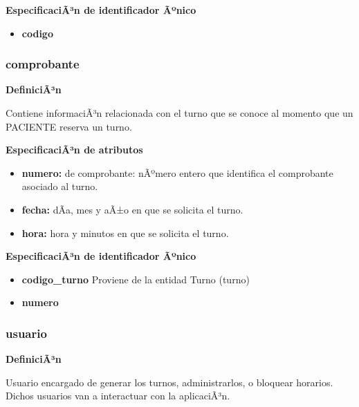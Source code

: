 \documentclass[a4paper,11pt]{article}
\begin{document}
\textbf{EspecificaciÃ³n de identificador Ãºnico}

\begin{itemize}

     \item \textbf{codigo}

\end{itemize}

\subsubsection{\textbf{comprobante}}

\textbf{DefiniciÃ³n}

Contiene informaciÃ³n relacionada con el turno que se conoce al momento que un 
PACIENTE reserva un turno.

\textbf{EspecificaciÃ³n de atributos}

\begin{itemize}

     \item \textbf{numero:} de comprobante: nÃºmero entero que identifica el comprobante asociado 
     al turno.

     \item \textbf{fecha:} dÃ­a, mes y aÃ±o en que se solicita el turno.

     \item \textbf{hora:} hora y minutos en que se solicita el turno.

\end{itemize}

\textbf{EspecificaciÃ³n de identificador Ãºnico}

\begin{itemize}

     \item \textbf{codigo\_turno} Proviene de la entidad Turno (turno)

     \item \textbf{numero}

\end{itemize}

\subsubsection{\textbf{usuario}}

\textbf{DefiniciÃ³n}

Usuario encargado de generar los turnos, administrarlos, o bloquear horarios.
Dichos usuarios van a interactuar con la aplicaciÃ³n.
\end{document}
